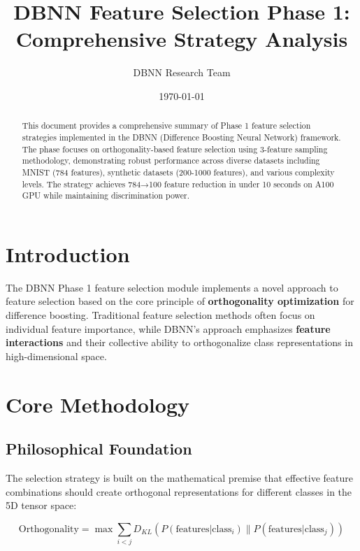\documentclass[11pt,a4paper]{article}
\title{DBNN Feature Selection Phase 1: Comprehensive Strategy Analysis}
\author{DBNN Research Team}
\date{\today}
\begin{document}
\maketitle

\begin{abstract}
This document provides a comprehensive summary of Phase 1 feature selection strategies implemented in the DBNN (Difference Boosting Neural Network) framework. The phase focuses on orthogonality-based feature selection using 3-feature sampling methodology, demonstrating robust performance across diverse datasets including MNIST (784 features), synthetic datasets (200-1000 features), and various complexity levels. The strategy achieves 784→100 feature reduction in under 10 seconds on A100 GPU while maintaining discrimination power.
\end{abstract}

\tableofcontents

\section{Introduction}

The DBNN Phase 1 feature selection module implements a novel approach to feature selection based on the core principle of \textbf{orthogonality optimization} for difference boosting. Traditional feature selection methods often focus on individual feature importance, while DBNN's approach emphasizes \textbf{feature interactions} and their collective ability to orthogonalize class representations in high-dimensional space.

\section{Core Methodology}

\subsection{Philosophical Foundation}

The selection strategy is built on the mathematical premise that effective feature combinations should create orthogonal representations for different classes in the 5D tensor space:

\begin{equation}
\text{Orthogonality} = \max \sum_{i<j} D_{KL}(P(\text{features}|\text{class}_i) \parallel P(\text{features}|\text{class}_j))
\end{equation}
\end{document}
